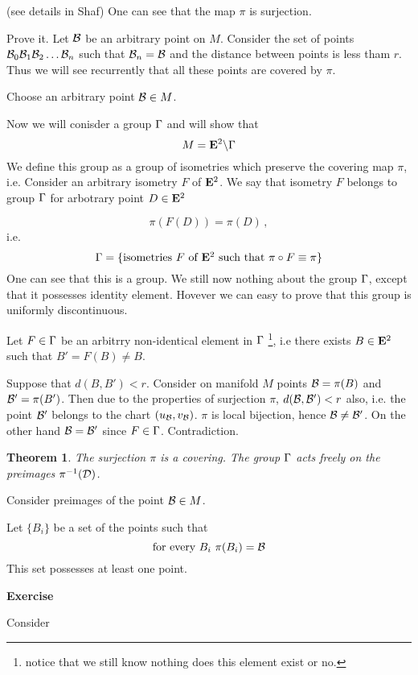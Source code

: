 \documentclass[12pt]{article}
\theoremstyle{theorem}
\newtheorem{thm}{Theorem}
\theoremstyle{lemma}
\numberwithin{equation}{section}
\begin{document}
(see details in {Shaf})
One can see that the map $\pi$ is surjection.               

Prove it. Let ${\cal B}$ be an arbitrary point on $M$.
Consider the set of points  ${\cal B}_0{\cal B}_1{\cal B}_2\dots{\cal B}_n$
such that ${\cal B}_n={\cal B}$ and the distance between points
is less tham $r$. Thus we will see recurrently that all 
these points  are covered by $\pi$.


  Choose an arbitrary point ${\cal B}\in M$.

Now we will conisder a group ${\Gamma}$ and will show
that 
        $$
   M={\bf E}^2\backslash {\Gamma}
        $$
We define this group as a group of isometries
which preserve the covering map $\pi$, i.e.
Consider an arbitrary isometry $F$ of ${\bf E}^2$.
We say that isometry $F$ belongs to group ${\Gamma}$
for arbotrary point $D\in {\bf E}^2$

     \begin{equation*}
	\pi\left(F\left(D\right)\right)=     
\pi\left(D\right)\,,
     \end{equation*}
i.e.     
\begin{equation*}
{\Gamma}=\{\hbox {isometries $F$ of ${\bf E}^2$  such that}\,\, 
\pi\circ F\equiv\pi\}
     \end{equation*}
One can see that this is a group.
We still now nothing about the group ${\Gamma}$,
except that it possesses identity element.
Hovever we can easy to prove that
this group is
uniformly discontinuous.

Let  $F\in {\Gamma}$ be an arbitrry non-identical element in ${\Gamma}$
\footnote{notice that we still know nothing
does this element exist or no.},
i.e  there exists $B\in {\bf E}^2$ such that $B'=F(B)\not=B$.

      Suppose that  $d(B,B')<r$. Consider on manifold
 $M$ points ${\cal B}=\pi(B)$ and ${\cal B}'=\pi(B')$.
 Then due to the properties of surjection
  $\pi$, $d({\cal B},{\cal B}')<r$ also, i.e. the point
  ${\cal B}'$ belongs to the chart $(u_{\cal B},v_{\cal B})$. 
$\pi$ is local bijection, hence ${\cal B}\not={\cal B}'$.
On the other hand ${\cal B}={\cal B}'$ since $F\in {\Gamma}$.
  Contradiction. 

\begin{thm}
The surjection $\pi$ is a covering. The group
${\Gamma}$ acts freely on the preimages $\pi^{-1}({\cal D})$.
\end{thm}

 

 Consider preimages of the  point ${\cal B}\in M$.




  Let $\{B_i\}$ be a set of the points such that
            $$
  \hbox{for every $B_i$}\,\,   \pi(B_i)={\cal B}
            $$
This set possesses at least one point. 

{\bf Exercise}

Consider 
\end{document}
